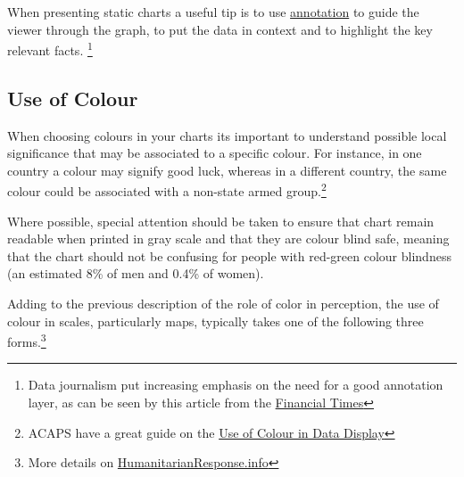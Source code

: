 \documentclass[
  a4paper,
  onecolumn,
  oneside]{book}
\begin{document}
When presenting static charts a useful tip is to use
\href{https://en.wikipedia.org/wiki/Annotation}{annotation} to guide the
viewer through the graph, to put the data in context and to highlight
the key relevant facts. \footnote{Data journalism put increasing
  emphasis on the need for a good annotation layer, as can be seen by
  this article from the
  \href{https://www.ft.com/content/4743ce96-e4bf-11e7-97e2-916d4fbac0da}{Financial
  Times}}

\hypertarget{use-of-colour}{%
\subsection{Use of Colour}\label{use-of-colour}}

When choosing colours in your charts its important to understand
possible local significance that may be associated to a specific colour.
For instance, in one country a colour may signify good luck, whereas in
a different country, the same colour could be associated with a
non-state armed group.\footnote{ACAPS have a great guide on the
  \href{https://www.acaps.org/use-colour-data-display}{Use of Colour in
  Data Display}}

Where possible, special attention should be taken to ensure that chart
remain readable when printed in gray scale and that they are colour
blind safe, meaning that the chart should not be confusing for people
with red-green colour blindness (an estimated 8\% of men and 0.4\% of
women).

Adding to the previous description of the role of color in perception,
the use of colour in scales, particularly maps, typically takes one of
the following three forms.\footnote{More details on
  \href{https://www.humanitarianresponse.info/en/programme-cycle/space}{HumanitarianResponse.info}}
\end{document}
